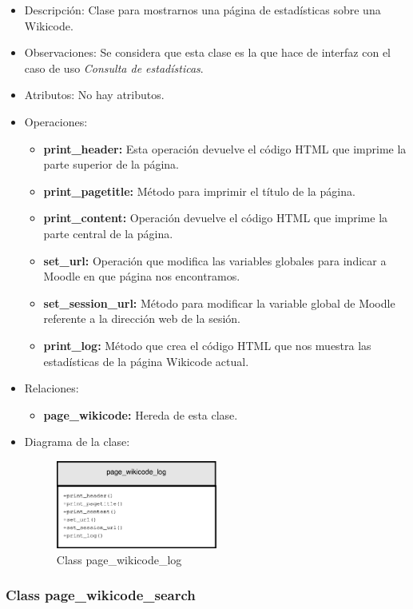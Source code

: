 \begin{itemize}
	\item Descripción: Clase para mostrarnos una página de estadísticas sobre una Wikicode.
	\item Observaciones: Se considera que esta clase es la que hace de interfaz con el caso de uso \emph{Consulta de estadísticas}.
	\item Atributos: No hay atributos.
	\item Operaciones:
		\begin{itemize}
			\item \textbf{print\_header: }Esta operación devuelve el código HTML que imprime la parte superior de la página.
			\item \textbf{print\_pagetitle: }Método para imprimir el título de la página.
			\item \textbf{print\_content: }Operación devuelve el código HTML que imprime la parte central de la página.
			\item \textbf{set\_url: }Operación que modifica las variables globales para indicar a Moodle en que página nos encontramos.
			\item \textbf{set\_session\_url: }Método para modificar la variable global de Moodle referente a la dirección web de la sesión.
			\item \textbf{print\_log: }Método que crea el código HTML que nos muestra las estadísticas de la página Wikicode actual.
		\end{itemize}
	\item Relaciones:
		\begin{itemize}
			\item \textbf{page\_wikicode:} Hereda de esta clase.
		\end{itemize}
	\item Diagrama de la clase:
		\begin{figure}[h]
			\centering
			\includegraphics[width=0.5\textwidth]{./img/page_wikicode_log.eps}
			\caption{Class page\_wikicode\_log}
		\end{figure}
\end{itemize}

\subsubsection{Class page\_wikicode\_search}


